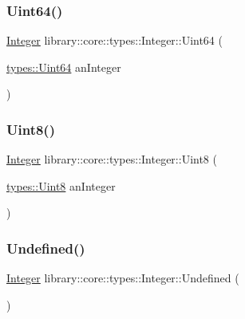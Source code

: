 \subsubsection{\texorpdfstring{Uint64()}{Uint64()}}
{\footnotesize\ttfamily \hyperlink{classlibrary_1_1core_1_1types_1_1_integer}{Integer} library\+::core\+::types\+::\+Integer\+::\+Uint64 (\begin{DoxyParamCaption}\item[{\hyperlink{namespacelibrary_1_1core_1_1types_a52eb5d32552dff72468cc9acee3dd70e}{types\+::\+Uint64}}]{an\+Integer }\end{DoxyParamCaption})\hspace{0.3cm}{\ttfamily [static]}}

\mbox{\label{classlibrary_1_1core_1_1types_1_1_integer_abf6d5cb5d0100ee859e35181d0287b61}} 
\subsubsection{\texorpdfstring{Uint8()}{Uint8()}}
{\footnotesize\ttfamily \hyperlink{classlibrary_1_1core_1_1types_1_1_integer}{Integer} library\+::core\+::types\+::\+Integer\+::\+Uint8 (\begin{DoxyParamCaption}\item[{\hyperlink{namespacelibrary_1_1core_1_1types_a2fb690dd0eb982f92a642dbd0c985662}{types\+::\+Uint8}}]{an\+Integer }\end{DoxyParamCaption})\hspace{0.3cm}{\ttfamily [static]}}

\mbox{\label{classlibrary_1_1core_1_1types_1_1_integer_a142c2df49031b787daf30673c73fcad7}} 
\subsubsection{\texorpdfstring{Undefined()}{Undefined()}}
{\footnotesize\ttfamily \hyperlink{classlibrary_1_1core_1_1types_1_1_integer}{Integer} library\+::core\+::types\+::\+Integer\+::\+Undefined (\begin{DoxyParamCaption}{ }\end{DoxyParamCaption})\hspace{0.3cm}{\ttfamily [static]}}

